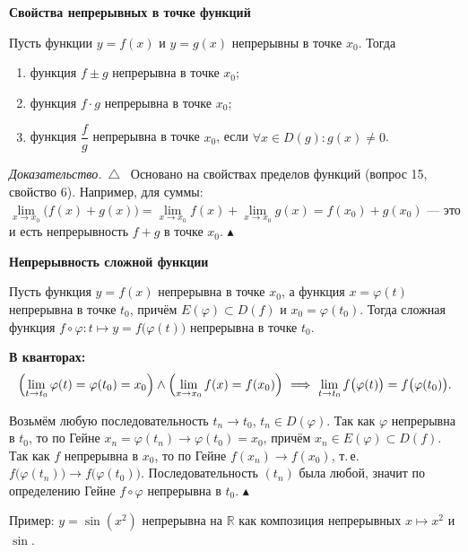 \documentclass[a4paper,11pt]{article}
\newcommand{\R}{\mathbb{R}}
\newcommand{\kv}{\par\noindent\textbf{\textcolor{oprc!85!black}{В кванторах:}}}
\newenvironment{dok}
  {\par\smallskip\noindent\textit{Доказательство.}\ $\triangle$\ \ignorespaces}
  {\unskip\nobreak\hfill$\blacktriangle$\par\smallskip}
\newcommand{\podr}[1]{\par\needspace{8\baselineskip}\medskip
  {\large\bfseries\textcolor{oprc!80!black}{#1}}\par\nopagebreak\smallskip}
\begin{document}
\podr{Свойства непрерывных в точке функций}

\begin{teo}
Пусть функции $y = f(x)$ и $y = g(x)$ непрерывны в точке $x_0$. Тогда
\begin{enumerate}
  \item функция $f \pm g$ непрерывна в точке $x_0$;
  \item функция $f \cdot g$ непрерывна в точке $x_0$;
  \item функция $\dfrac{f}{g}$ непрерывна в точке $x_0$, если $\forall x \in D(g)\colon g(x) \ne 0$.
\end{enumerate}
\end{teo}

\begin{dok}
Основано на свойствах пределов функций (вопрос 15, свойство 6). Например, для суммы:
$\lim\limits_{x \to x_0} \bigl(f(x) + g(x)\bigr) = \lim\limits_{x \to x_0} f(x) + \lim\limits_{x \to x_0} g(x) = f(x_0) + g(x_0)$ ---
это и есть непрерывность $f + g$ в точке $x_0$.
\end{dok}

\podr{Непрерывность сложной функции}

\begin{teo}
Пусть функция $y = f(x)$ непрерывна в точке $x_0$, а функция $x = \varphi(t)$ непрерывна в точке $t_0$,
причём $E(\varphi) \subset D(f)$ и $x_0 = \varphi(t_0)$. Тогда сложная функция $f \circ \varphi\colon t \mapsto y = f\bigl(\varphi(t)\bigr)$
непрерывна в точке $t_0$.
\kv
\[
  \Bigl(\lim_{t \to t_0} \varphi(t) = \varphi(t_0) = x_0\Bigr) \wedge \Bigl(\lim_{x \to x_0} f(x) = f(x_0)\Bigr)
  \ \Longrightarrow\ \lim_{t \to t_0} f\bigl(\varphi(t)\bigr) = f\bigl(\varphi(t_0)\bigr).
\]
\end{teo}

\begin{dop}
Возьмём любую последовательность $t_n \to t_0$, $t_n \in D(\varphi)$. Так как $\varphi$ непрерывна в $t_0$, то по Гейне
$x_n = \varphi(t_n) \to \varphi(t_0) = x_0$, причём $x_n \in E(\varphi) \subset D(f)$. Так как $f$ непрерывна в $x_0$, то по Гейне
$f(x_n) \to f(x_0)$, т.\,е. $f\bigl(\varphi(t_n)\bigr) \to f\bigl(\varphi(t_0)\bigr)$. Последовательность $(t_n)$ была любой,
значит по определению Гейне $f \circ \varphi$ непрерывна в $t_0$. \hfill$\blacktriangle$
\end{dop}

Пример: $y = \sin(x^2)$ непрерывна на $\R$ как композиция непрерывных $x \mapsto x^2$ и $\sin$.
\end{document}
